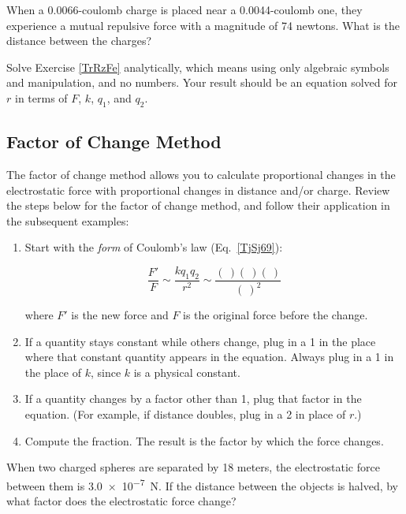 \documentclass[dvipsnames]{article}
\numberwithin{equation}{section}
\numberwithin{figure}{section}
\begin{document}
\begin{exercise} \label{bpbHHg}
    When a 0.0066-coulomb charge is placed near a 0.0044-coulomb one, they experience a mutual repulsive force with a magnitude of 74 newtons. What is the distance between the charges?
\end{exercise}


\begin{exercise} \label{DOuqpT}
    Solve Exercise \ref{TrRzFe} analytically, which means using
    only algebraic symbols and manipulation, and no numbers. Your result should be an equation solved for $r$ in terms of $F$, $k$, $q_1$, and $q_2$.
\end{exercise}
\clearpage

\subsection{Factor of Change Method} \label{MeMuHN}

The \gls{factor of change method} allows you to calculate proportional changes in the electrostatic force with proportional changes in distance and/or charge. Review the steps below for the factor of change method, and follow their application in the subsequent examples:

\begin{enumerate}
\setlength\itemsep{-1ex}
    \item Start with the \textit{form} of Coulomb's law (Eq.~\ref{TjSj69}):

    \begin{equation} \label{GQoZ3E}
        \frac{F'}{F} \sim \frac{k q_1 q_2}{r^2} \sim \frac{(\ )(\ )(\ )}{(\ )^2}
    \end{equation}

    where $F'$ is the new force and $F$ is the original force before the change.
    \item If a quantity stays constant while others change, plug in a 1 in the place where that constant quantity appears in the equation. Always plug in a 1 in the place of $k$, since $k$ is a physical constant.
    \item If a quantity changes by a factor other than 1, plug that factor in the equation. (For example, if distance doubles, plug in a 2 in place of $r$.)
    \item Compute the fraction. The result is the factor by which the force changes.
\end{enumerate}

\begin{example} \label{oKeOMF}
When two charged spheres are separated by 18 meters, the electrostatic force between them is \SI{3.0e-7}{N}. If the distance between the objects is halved, by what factor does the electrostatic force change?
\end{example}
\end{document}

